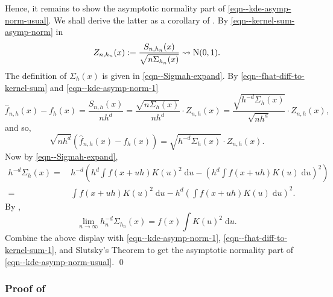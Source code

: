Hence, it remains to show the asymptotic normality part of
\eqref{eqn--kde-asymp-norm-usual}.
We shall derive the latter as a corollary of .
By \eqref{eqn--kernel-sum-asymp-norm} in 
\begin{equation}
  Z_{n, h_{n}} (x) := \frac{S_{n, h_{n}} (x)}{\sqrt{n \Sigma_{h_{n}} (x)}}
  \rightsquigarrow \mathrm{N} (0, 1).
  \label{eqn--kde-asymp-norm-1}
\end{equation}
The definition of \(\Sigma_{h} (x)\) is given in \eqref{eqn--Sigmah-expand}.
By \eqref{eqn--fhat-diff-to-kernel-sum} and \eqref{eqn--kde-asymp-norm-1}
\begin{equation*}
  \widehat{f}_{n, h} (x) - f_{h} (x) = \frac{S_{n, h} (x)}{n h^{d}} =
  \frac{\sqrt{n \Sigma_{h} (x)}}{n h^{d}} \cdot Z_{n, h} (x) = \frac{\sqrt{h^{-
  d} \Sigma_{h} (x)}}{\sqrt{n h^{d}}} \cdot Z_{n, h} (x),
\end{equation*}
and so,
\begin{equation}
  \sqrt{n h^{d}} \left( \widehat{f}_{n, h} (x) - f_{h} (x) \right) =
  \sqrt{h^{- d} \Sigma_{h} (x)} \cdot Z_{n, h} (x).
  \label{eqn--fhat-diff-to-kernel-sum-1}
\end{equation}
Now by \eqref{eqn--Sigmah-expand},
\begin{align*}
  h^{- d} \Sigma_{h} (x) =
  & \, h^{- d} \left( h^{d} \int f (x + u h) K (u)^{2} \; \mathrm{d} u - \left(
  h^{d} \int f (x + u h) K (u) \; \mathrm{d} u \right)^{2} \right) \\
  =
  & \, \int f (x + u h) K (u)^{2} \; \mathrm{d} u - h^{d} \left( \int f (x + u
  h) K (u) \; \mathrm{d} u \right)^{2}.
\end{align*}
By ,
\begin{equation*}
  \lim_{n \to \infty} h_{n}^{- d} \Sigma_{h_{n}} (x) = f (x) \int K (u)^{2} \;
  \mathrm{d} u.
\end{equation*}
Combine the above display with \eqref{eqn--kde-asymp-norm-1},
\eqref{eqn--fhat-diff-to-kernel-sum-1}, and Slutsky's Theorem to get the
asymptotic normality part of \eqref{eqn--kde-asymp-norm-usual}.
\qed

\subsubsection{Proof of
\texorpdfstring{}{Theorem
\ref{thm--kernel-sum-asymp-norm}}}
\label{sec--prf--thm--kernel-sum-asymp-norm}

